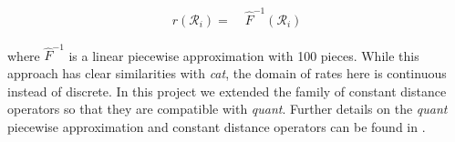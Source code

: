 \documentclass[10pt,letterpaper]{article}
\begin{document}
\begin{align}
r(\mathcal{R}_i) =& \; \hat{F}^{-1}(\mathcal{R}_i)
\end{align}

where $\hat{F}^{-1}$ is a linear piecewise approximation with 100 pieces.
While this approach has clear similarities with \textit{cat}, the domain of rates here is continuous instead of discrete.
In this project we extended the family of constant distance operators  \cite{zhang2020improving} so that they are compatible with \textit{quant}.
Further details on the \textit{quant} piecewise approximation and constant distance operators can be found in \textbf{}. 
















\clearpage
\end{document}
